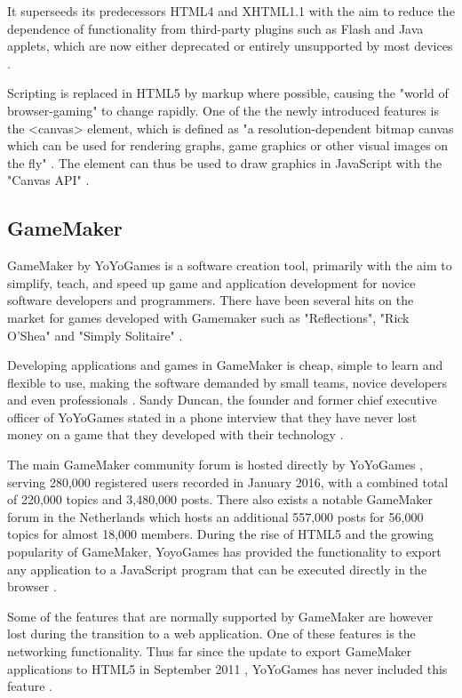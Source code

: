 \documentclass[bsc, 12pt, twoside, singlespacing, parskip, abbrevs, notimes, normalheadings, logo, deptreport]{styles/infthesis}
\begin{document}
It superseeds its predecessors HTML4 and XHTML1.1 with the aim to reduce the dependence of functionality from third-party plugins such as Flash and Java applets, which are now either deprecated or entirely unsupported by most devices \cite{Death_Flash_Java}.

Scripting is replaced in HTML5 by markup where possible, causing the "world of browser-gaming" to change rapidly. One of the the newly introduced features is the <canvas> element, which is defined as "a resolution-dependent bitmap canvas which can be used for rendering graphs, game graphics or other visual images on the fly" \cite{HTML5_Up_and_Running}. The element can thus be used to draw graphics in JavaScript with the "Canvas API" \cite{Canvas_API}.

\subsection{GameMaker}
GameMaker by YoYoGames is a software creation tool, primarily with the aim to simplify, teach, and speed up game and application development for novice software developers and programmers. There have been several hits on the market for games developed with Gamemaker such as "Reflections", "Rick O'Shea" and "Simply Solitaire" \cite{Gamemaker_DnD}.

Developing applications and games in GameMaker is cheap, simple to learn and flexible to use, making the software demanded by small teams, novice developers and even professionals \cite{Mark_Overmars}. Sandy Duncan, the founder and former chief executive officer of YoYoGames stated in a phone interview that they have never lost money on a game that they developed with their technology \cite{Gamemaker_DnD}.

The main GameMaker community forum is hosted directly by YoYoGames \cite{yoyogames_forum}, serving 280,000 registered users recorded in January 2016, with a combined total of 220,000 topics and 3,480,000 posts. There also exists a notable GameMaker forum in the Netherlands \cite{dutch_gamemaker_forum} which hosts an additional 557,000 posts for 56,000 topics for almost 18,000 members. During the rise of HTML5 and the growing popularity of GameMaker, YoyoGames has provided the functionality to export any application to a JavaScript program that can be executed directly in the browser \cite{GameMaker_Studio}.

Some of the features that are normally supported by GameMaker are however lost during the transition to a web application. One of these features is the networking functionality. Thus far since the update to export GameMaker applications to HTML5 in September 2011 \cite{HTML5_Game_Dev_Gamemaker}, YoYoGames has never included this feature \cite{gamemaker_missing_networking}.
\end{document}

